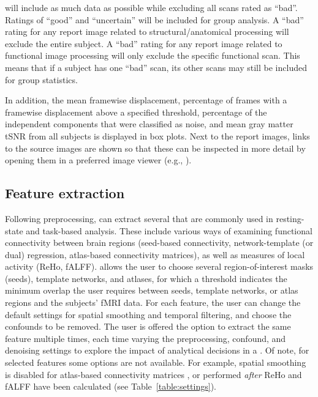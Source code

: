  will include as much data as possible while excluding all
scans rated as ``bad''. Ratings of ``good'' and ``uncertain'' will be
included for group analysis. A ``bad'' rating for any report image related
to structural/anatomical processing will exclude the entire subject. A 
``bad'' rating for any report image related to functional image processing
will only exclude the specific functional scan. This means that if a
subject has one ``bad'' scan, its other scans may still be included for
group statistics.

In addition, the mean framewise displacement, percentage of frames with a
framewise displacement above a specified threshold, percentage of the
independent components that were classified as noise, and mean gray matter
tSNR from all subjects is displayed in box plots. Next to the report
images, links to the source images are shown so that these can be inspected
in more detail by opening them in a preferred image viewer (e.g.,
).

\subsection{Feature extraction}

Following preprocessing,  can extract several
 that are commonly used in resting-state and task-based
analysis. These include various ways of examining functional connectivity
between brain regions (seed-based connectivity, network-template (or dual)
regression, atlas-based connectivity matrices), as well as measures of
local activity (ReHo, fALFF).  allows the user to choose
several region-of-interest masks (seeds), template networks, and atlases,
for which a threshold indicates the minimum overlap the user requires
between seeds, template networks, or atlas regions and the subjects' fMRI
data. For each feature, the user can change the default settings for
spatial smoothing and temporal filtering, and choose the confounds to be
removed. The user is offered the option to extract the same feature
multiple times, each time varying the preprocessing, confound, and
denoising settings to explore the impact of analytical decisions in a
. Of note, for selected features some options are
not available. For example, spatial smoothing is disabled for atlas-based
connectivity matrices \citep{10.1111/ejn.13717}, or performed \emph{after}
ReHo and fALFF have been calculated (see Table~\ref{table:settings}).

